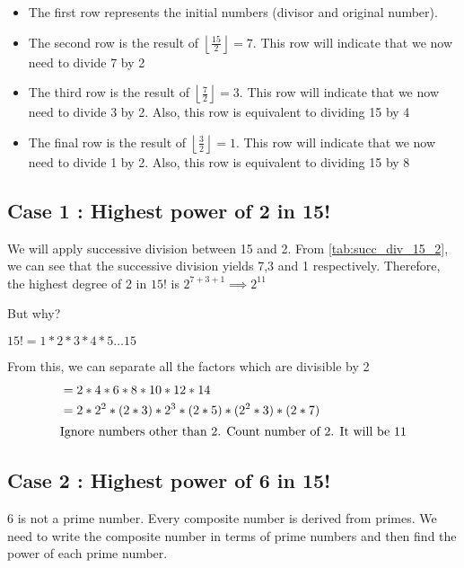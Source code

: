 \begin{itemize}
    \item The first row represents the initial numbers (divisor and original number). 
    \item The second row is the result of $\displaystyle{ \left \lfloor \frac{15}{2} \right \rfloor} = 7$. This row will indicate that we now need to divide 7 by 2
    \item The third row is the result of $\displaystyle{ \left \lfloor \frac{7}{2} \right \rfloor} = 3$. This row will indicate that we now need to divide 3 by 2. Also, this row is equivalent to dividing 15 by 4
    \item The final row is the result of $\displaystyle{ \left \lfloor \frac{3}{2} \right \rfloor} = 1$. This row will indicate that we now need to divide 1 by 2. Also, this row is equivalent to dividing 15 by 8
\end{itemize}


\subsection{Case 1 : Highest power of 2 in 15!} \label{subsec:highest_power_of_2_in_fact_15}

We will apply successive division between 15 and 2. From \ref{tab:succ_div_15_2}, we can see that the successive division yields 7,3 and 1 respectively. Therefore, the highest degree of 2 in $15!$ is $2^{7 + 3 + 1} \implies 2^{11}$ 

But why?

$15! = 1 * 2 * 3 * 4 * 5 \ldots 15$

From this, we can separate all the factors which are divisible by 2
\begin{align*}
    &= 2 * 4 * 6 * 8 * 10 * 12 * 14 \\
    &= 2 * 2^2 * (2*3) * 2^3 * (2*5) * (2^2 * 3) * (2*7) \\
    \shortintertext{Ignore numbers other than 2. Count number of 2. It will be 11}
\end{align*}

\subsection{Case 2 : Highest power of 6 in 15!}

6 is not a prime number. Every composite number is derived from primes. We need to write the composite number in terms of prime numbers and then find the power of each prime number. 

